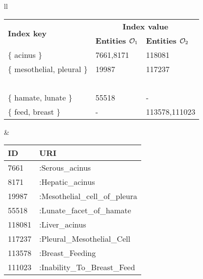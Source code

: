 \centering
{

\begin{tabular}{ll}
\begin{footnotesize}
\begin{tabular}[t]{|l||l|l|}
\hline 

\multirow{2}{*}{\textbf{Index key}} & \multicolumn{2}{c|}{\textbf{Index value}}
\\\cline{2-3} 
& \textbf{Entities $\mathcal{O}_1$} & \textbf{Entities $\mathcal{O}_2$} \\\hline

$\{$ acinus $\}$ & 7661,8171 & 118081 \\\hline

$\{$ mesothelial, pleural $\}$ & 19987 & 117237 \\\hline
 \multicolumn{3}{c}{\tiny{~}\vspace{-0.21cm}} \\\hline

$\{$ hamate, lunate $\}$ & 55518 & - \\\hline

$\{$ feed, breast $\}$ & - & 113578,111023 \\\hline






\end{tabular}
\end{footnotesize}
&
\begin{scriptsize}
\begin{tabular}[t]{|l||l|}
\hline 
\textbf{ID} & \textbf{URI} \\\hline
7661 & \ontoOne:Serous\_acinus \\
8171 & \ontoOne:Hepatic\_acinus \\
19987 & \ontoOne:Mesothelial\_cell\_of\_pleura\\
55518 & \ontoOne:Lunate\_facet\_of\_hamate\\\hline
118081 & \ontoTwo:Liver\_acinus \\
117237 & \ontoTwo:Pleural\_Mesothelial\_Cell\\
113578 & \ontoTwo:Breast\_Feeding\\
111023 & \ontoTwo:Inability\_To\_Breast\_Feed\\\hline


\end{tabular}
\end{scriptsize}
\end{tabular}}
